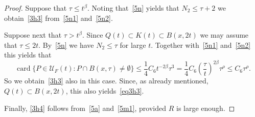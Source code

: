 \documentclass[10pt,a4paper]{amsart}
\def\cU{\mathcal U}
\def\card{\operatorname{card}}
\begin{document}
\begin{proof}
Suppose that $\tau\leq t^\beta$. 
Noting that~\eqref{5n} yields that $N_2\leq \tau+2$ we obtain~\eqref{3h3}
from~\eqref{5n1} and~\eqref{5n2}.

Suppose next that $\tau> t^\beta$.
Since $Q(t)\subset K(t)\subset B(x,2t)$ we may assume that $\tau\leq 2t$.
By~\eqref{5n} we have $N_2\leq \tau$ for large $t$.
Together with~\eqref{5n1} and~\eqref{5n2} this yields that 
\begin{equation}\label{5n3}
\card\{P\in  \cU_F(t)\colon P\cap B(x,\tau)\neq\emptyset\}
\leq \frac14 C_6 t^{-2\beta} \tau^3
=\frac14 C_6 \left(\frac{\tau}{t}\right)^{2\beta} \tau^\rho\leq C_6 \tau^\rho.
\end{equation}
So we obtain~\eqref{3h3} also in this case.
Since, as already mentioned, $Q(t)\subset B(x,2t)$, this also yields~\eqref{eq3h3}.

Finally, \eqref{3h4} follows from~\eqref{5a} and~\eqref{5m1}, provided
$R$ is large enough.
\end{proof}
\end{document}
